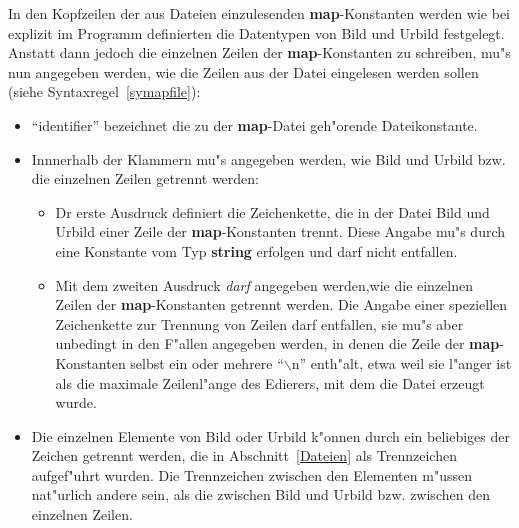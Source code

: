 In den Kopfzeilen der aus
Dateien einzulesenden {\bf map}-Konstanten 
 werden wie bei explizit im
Programm definierten die Datentypen von Bild und Urbild festgelegt.
Anstatt dann jedoch die einzelnen Zeilen der {\bf map}-Konstanten
 zu schreiben, mu"s nun angegeben werden, wie die Zeilen
aus der Datei eingelesen werden sollen (siehe
Syntaxregel~\ref{symapfile}):

\begin{itemize}
  
\item ``identifier'' bezeichnet die zu der {\bf map}-Datei
geh"orende Dateikonstante.

  
\item Innnerhalb der Klammern mu"s angegeben werden, wie Bild und
Urbild bzw. die einzelnen Zeilen getrennt werden:
     \begin{itemize} 
            \item Dr erste Ausdruck definiert die Zeichenkette, die in
		  der Datei Bild und Urbild einer Zeile der {\bf
		  map}-Konstanten trennt. Diese Angabe mu"s
                  durch eine Konstante vom Typ {\bf
		  string} erfolgen und darf
                  nicht entfallen.
            \item Mit dem zweiten Ausdruck {\it darf\/} angegeben
		  werden,wie die
                  einzelnen Zeilen der {\bf map}-Konstanten
		  getrennt werden. Die Angabe einer speziellen 
                  Zeichenkette
		  zur Trennung von Zeilen darf entfallen, sie mu"s aber unbedingt in den 
                  F"allen angegeben werden, in denen die Zeile der {\bf map}-Konstanten selbst ein
                  oder mehrere  ``$\backslash$n'' enth"alt, etwa weil sie l"anger ist als die maximale
                  Zeilenl"ange des Edierers, mit dem die Datei erzeugt wurde.
	\end{itemize}
  \item Die einzelnen Elemente von Bild oder Urbild k"onnen durch ein beliebiges der Zeichen
        getrennt werden, die in Abschnitt~\ref{Dateien} als Trennzeichen aufgef"uhrt wurden.
	Die  Trennzeichen zwischen den Elementen m"ussen nat"urlich andere sein, als die zwischen
        Bild und Urbild bzw. zwischen den einzelnen Zeilen.
\end{itemize}

